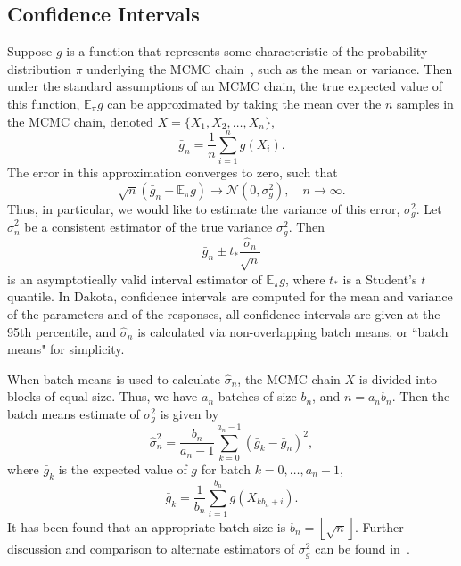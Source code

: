 \subsection{Confidence Intervals}

Suppose $g$ is a function that represents some characteristic of the 
probability distribution $\pi$ underlying the MCMC chain~\cite{Fle10}, such 
as the mean or variance. Then under the standard assumptions of an MCMC chain, 
the true expected value of this function, $\mathbb{E}_{\pi}g$ can be 
approximated by taking the mean over the $n$ samples in the MCMC chain, denoted
$X = \{X_{1}, X_{2}, \ldots, X_{n} \}$,
\begin{equation}
  \bar{g}_{n} = \frac{1}{n} \sum_{i = 1}^{n} g(X_{i}). 
\end{equation}
The error in this approximation converges to zero, such that
\begin{equation}
  \sqrt{n}\left( \bar{g}_{n} - \mathbb{E}_{\pi}g \right) \rightarrow
  \mathcal{N}(0, \sigma_{g}^{2}), \quad n \rightarrow \infty.
\end{equation}
Thus, in particular, we would like to estimate the variance of this error,
$\sigma_{g}^{2}$. Let $\hat{\sigma}_{n}^{2}$ be a consistent estimator of
the true variance $\sigma_{g}^{2}$. Then 
\begin{equation}
  \bar{g}_{n} \pm t_{*} \frac{\hat{\sigma}_{n}}{\sqrt{n}}
\end{equation}
is an asymptotically valid interval estimator of $\mathbb{E}_{\pi}g$, where
$t_{*}$ is a Student's $t$ quantile. In Dakota, confidence intervals are
computed for the mean and variance of the parameters and of the responses,
all confidence intervals are given at the 95th percentile, and 
$\hat{\sigma}_{n}$ is calculated via non-overlapping batch means, or ``batch 
means" for simplicity.

When batch means is used to calculate $\hat{\sigma}_{n}$, the MCMC chain $X$
is divided into blocks of equal size. Thus, we have $a_{n}$ batches of size 
$b_{n}$, and $n = a_{n}b_{n}$. Then the batch means estimate of 
$\sigma_{g}^{2}$ is given by
\begin{equation}
  \hat{\sigma}_{n}^{2} = \frac{b_{n}}{a_{n} -1} \sum_{k = 0}^{a_{n}-1}
                         \left( \bar{g}_{k} - \bar{g}_{n} \right)^{2},
\end{equation}
where $\bar{g}_{k}$ is the expected value of $g$ for batch $k = 0, \ldots,
a_{n}-1$,
\begin{equation}
  \bar{g}_{k} = \frac{1}{b_{n}} \sum_{i = 1}^{b_{n}} 
                g\left(X_{kb_{n}+i}\right).
\end{equation}
It has been found that an appropriate batch size is $b_{n} = \left 
\lfloor{\sqrt{n}}\right \rfloor$. Further discussion and comparison to
alternate estimators of $\sigma_{g}^{2}$ can be found in~\cite{Fle10}.

